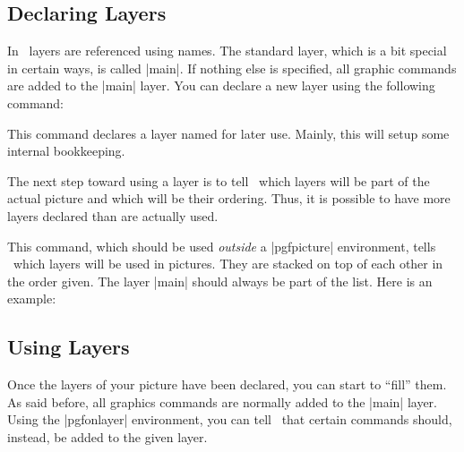 \subsection{Declaring Layers}

In \pgfname\ layers are referenced using names. The standard layer,
which is a bit special in certain ways, is called |main|. If nothing
else is specified, all graphic commands are added to the |main|
layer. You can declare a new layer using the following command:

\begin{command}{\pgfdeclarelayer{}}
  This command declares a layer named  for later
  use. Mainly, this will setup some internal bookkeeping.
\end{command}

The next step toward using a layer is to tell \pgfname\ which layers
will be part of the actual picture and which will be their
ordering. Thus, it is possible to have more layers declared than are
actually used.

\begin{command}{\pgfsetlayers{}}
  This command, which should be used \emph{outside} a |{pgfpicture}|
  environment, tells \pgfname\ which layers will be used in
  pictures. They are stacked on top of each other in the order
  given. The layer |main| should always be part of the list. Here is
  an example:
\begin{codeexample}
\end{codeexample}
\end{command}


\subsection{Using Layers}

Once the layers of your picture have been declared, you can start to
``fill'' them. As said before, all graphics commands are normally
added to the |main| layer. Using the |{pgfonlayer}| environment, you
can tell \pgfname\ that certain commands should, instead, be added to
the given layer.

